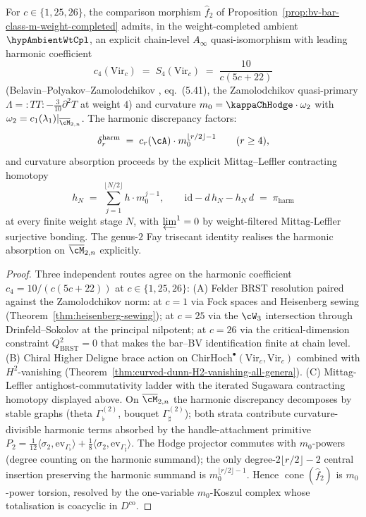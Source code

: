 \begin{proposition}[Explicit chain-level $A_\infty$ quasi-iso at $g=2$
for $\mathrm{Vir}_c$ at $c \in \{1, 25, 26\}$; licensing
$\alpha + \gamma + \delta + \varepsilon$;
\ClaimStatusProvedHere]
\label{prop:bv-bar-virasoro-g2-explicit}
For $c \in \{1, 25, 26\}$, the comparison morphism $\widehat f_2$ of
Proposition~\ref{prop:bv-bar-class-m-weight-completed} admits, in the
weight-completed ambient $\hypAmbientWtCpl$, an explicit chain-level
$A_\infty$ quasi-isomorphism with leading harmonic coefficient
\[
 c_4(\mathrm{Vir}_c) \;=\; S_4(\mathrm{Vir}_c)
 \;=\; \frac{10}{c(5c + 22)}
\]
(Belavin--Polyakov--Zamolodchikov \cite{BPZ84}, eq.~(5.41), the
Zamolodchikov quasi-primary $\Lambda = {:}TT{:} -
\tfrac{3}{10}\partial^2 T$ at weight $4$) and curvature
$m_0 = \kappaChHodge \cdot \omega_2$ with $\omega_2 = c_1(\lambda_1)
|_{\overline{\cM}_{2, n}}$. The harmonic discrepancy factors:
\[
 \delta_r^{\mathrm{harm}}
 \;=\;
 c_r(\cA)\cdot m_0^{\lfloor r/2 \rfloor - 1}
 \qquad (r \geq 4),
\]
and curvature absorption proceeds by the explicit Mittag--Leffler
contracting homotopy
\[
 h_N \;=\; \sum_{j = 1}^{\lfloor N/2 \rfloor} h \cdot m_0^{j - 1},
\qquad
 \mathrm{id} - d\, h_N - h_N\, d \;=\; \pi_{\mathrm{harm}}
\]
at every finite weight stage $N$, with $\varprojlim^1 = 0$ by
weight-filtered Mittag-Leffler surjective bonding. The genus-$2$
Fay trisecant identity realises the harmonic absorption on
$\overline{\cM}_{2, n}$ explicitly.
\end{proposition}

\begin{proof}
Three independent routes agree on the harmonic coefficient
$c_4 = 10/(c(5c + 22))$ at $c \in \{1, 25, 26\}$:
(A) Felder BRST resolution paired against the Zamolodchikov norm:
at $c = 1$ via Fock spaces and Heisenberg sewing
\textup{(}Theorem~\ref{thm:heisenberg-sewing}\textup{)}; at $c = 25$ via
the $\cW_3$ intersection through Drinfeld--Sokolov at the principal
nilpotent; at $c = 26$ via the critical-dimension constraint
$Q_{\mathrm{BRST}}^2 = 0$ that makes the bar--BV identification
finite at chain level.
(B) Chiral Higher Deligne brace action on
$\mathrm{ChirHoch}^\bullet(\mathrm{Vir}_c, \mathrm{Vir}_c)$ combined
with $H^2$-vanishing
\textup{(}Theorem~\ref{thm:curved-dunn-H2-vanishing-all-genera}\textup{)}.
(C) Mittag-Leffler antighost-commutativity ladder with the iterated
Sugawara contracting homotopy displayed above.
On $\overline{\cM}_{2, n}$ the harmonic discrepancy decomposes by
stable graphs (theta $\Gamma^{(2)}_\flat$, bouquet $\Gamma^{(2)}_\sharp$);
both strata contribute curvature-divisible harmonic terms absorbed
by the handle-attachment primitive
$P_2 = \tfrac{1}{12}\langle \sigma_2, \mathrm{ev}_{\Gamma_\flat}\rangle
+ \tfrac{1}{8}\langle \sigma_2, \mathrm{ev}_{\Gamma_\sharp}\rangle$.
The Hodge projector commutes with $m_0$-powers (degree counting on
the harmonic summand); the only degree-$2\lfloor r/2 \rfloor - 2$
central insertion preserving the harmonic summand is
$m_0^{\lfloor r/2 \rfloor - 1}$. Hence
$\operatorname{cone}(\widehat f_2)$ is $m_0$-power torsion, resolved
by the one-variable $m_0$-Koszul complex whose totalisation is
coacyclic in $D^{\mathrm{co}}$.
\end{proof}

